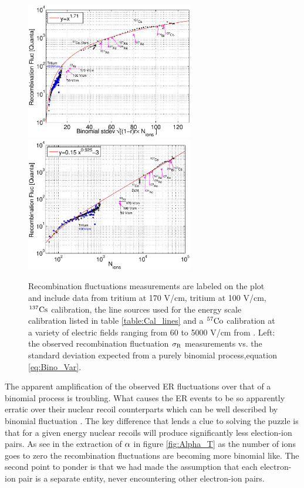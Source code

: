 \begin{figure}[h!]\centering
\includegraphics[width=73mm]{Chapter_Flucs/Figures/alpha/bino_amp_100_iter1.eps}
\includegraphics[width=73mm]{Chapter_Flucs/Figures/alpha/R_v_Ni_100_iter1.eps}
\caption{ Recombination fluctuations measurements are labeled on the plot and include data from tritium at 170 V/cm, tritium at 100 V/cm, $\rm ^{137}Cs$ calibration, the line sources used for the energy scale calibration listed in table \ref{table:Cal_lines} and a $\rm ^{57}Co$ calibration at a variety of electric fields ranging from 60 to 5000 V/cm from \cite{Dahl_Thesis}. Left: the observed recombination fluctuation $\rm \sigma_R$ measurements vs. the standard deviation expected from a purely binomial process,equation \ref{eq:Bino_Var}. }
\label{fig:R_Big}
\end{figure}


The apparent amplification of the observed ER fluctuations over that of a binomial process is troubling. What causes the ER events to be so apparently erratic over their nuclear recoil counterparts which can be well described by binomial fluctuation \cite{Dahl_Thesis}. The key difference that lends a clue to solving the puzzle is that for a given energy nuclear recoils will produce significantly less election-ion pairs. As see in the extraction of $\rm \alpha$ in figure \ref{fig:Alpha_T} as the number of ions goes to zero the recombination fluctuations are becoming more binomial like. The second point to ponder is that we had made the assumption that each electron-ion pair is a separate entity, never encountering other electron-ion pairs. 

